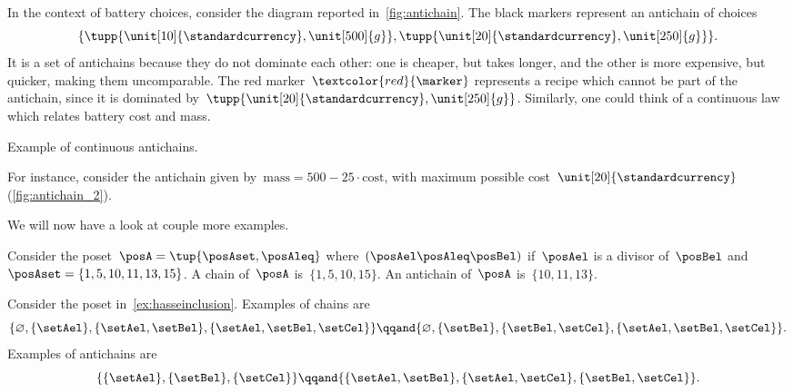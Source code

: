 In the context of battery choices, consider the diagram reported in~\cref{fig:antichain}.
The black markers represent an antichain of choices
\begin{equation}
    \{
    \tupp{\unit[10]{\standardcurrency},\unit[500]{g}},
    \tupp{\unit[20]{\standardcurrency},\unit[250]{g}}
    \}.
\end{equation}
It is a set of antichains because they do not dominate each other: one is cheaper, but takes longer, and the other is more expensive, but quicker, making them uncomparable.
The red marker~$\textcolor{red}{\marker}$ represents a recipe which cannot be part of the antichain, since it is dominated by~$\tupp{\unit[20]{\standardcurrency},\unit[250]{g}}$.
Similarly, one could think of a continuous law which relates battery cost and mass.
%
\begin{marginfigure}
    \centering
    \caption{Example of continuous antichains.}
    \label{fig:antichain_2}
\end{marginfigure}
%
For instance, consider the antichain given by~$\text{mass}=500-25\cdot \text{cost}$, with maximum possible cost~$\unit[20]{\standardcurrency}$ (\cref{fig:antichain_2}).

We will now have a look at couple more examples.
\begin{example}
    Consider the poset~$\posA=\tup{\posAset,\posAleq}$ where~$(\posAel \posAleq \posBel)$ if~$\posAel$ is a divisor of~$\posBel$ and~$\posAset=\{1,5,10,11,13,15\}$.
    A chain of~$\posA$ is~$\{1,5,10,15\}$.
    An antichain of~$\posA$ is~$\{10,11,13\}$.
\end{example}

\begin{example}
    Consider the poset in~\cref{ex:hasseinclusion}.
    Examples of chains are
    \begin{equation}
        \{\varnothing,\{\setAel\},\{\setAel,\setBel\},\{\setAel,\setBel,\setCel\}\}
        \qqand
        \{\varnothing,\{\setBel\},\{\setBel,\setCel\},\{\setAel,\setBel,\setCel\}\}.
    \end{equation}
    Examples of antichains are
    \begin{equation}
        \{\{\setAel\},\{\setBel\},\{\setCel\}\}
        \qqand
        \{ \{\setAel,\setBel\},\{\setAel,\setCel\}, \{\setBel,\setCel\}\}.
    \end{equation}
\end{example}
